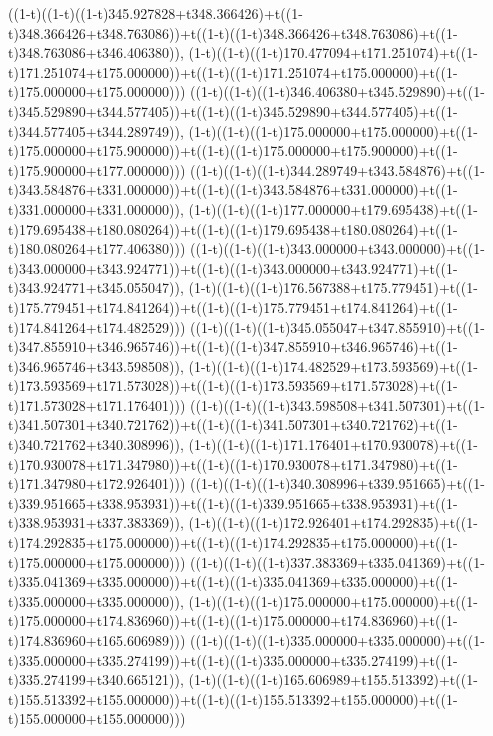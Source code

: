 ((1-t)((1-t)((1-t)345.927828+t348.366426)+t((1-t)348.366426+t348.763086))+t((1-t)((1-t)348.366426+t348.763086)+t((1-t)348.763086+t346.406380)),                                     (1-t)((1-t)((1-t)170.477094+t171.251074)+t((1-t)171.251074+t175.000000))+t((1-t)((1-t)171.251074+t175.000000)+t((1-t)175.000000+t175.000000)))
((1-t)((1-t)((1-t)346.406380+t345.529890)+t((1-t)345.529890+t344.577405))+t((1-t)((1-t)345.529890+t344.577405)+t((1-t)344.577405+t344.289749)),                                     (1-t)((1-t)((1-t)175.000000+t175.000000)+t((1-t)175.000000+t175.900000))+t((1-t)((1-t)175.000000+t175.900000)+t((1-t)175.900000+t177.000000)))
((1-t)((1-t)((1-t)344.289749+t343.584876)+t((1-t)343.584876+t331.000000))+t((1-t)((1-t)343.584876+t331.000000)+t((1-t)331.000000+t331.000000)),                                     (1-t)((1-t)((1-t)177.000000+t179.695438)+t((1-t)179.695438+t180.080264))+t((1-t)((1-t)179.695438+t180.080264)+t((1-t)180.080264+t177.406380)))
((1-t)((1-t)((1-t)343.000000+t343.000000)+t((1-t)343.000000+t343.924771))+t((1-t)((1-t)343.000000+t343.924771)+t((1-t)343.924771+t345.055047)),                                     (1-t)((1-t)((1-t)176.567388+t175.779451)+t((1-t)175.779451+t174.841264))+t((1-t)((1-t)175.779451+t174.841264)+t((1-t)174.841264+t174.482529)))
((1-t)((1-t)((1-t)345.055047+t347.855910)+t((1-t)347.855910+t346.965746))+t((1-t)((1-t)347.855910+t346.965746)+t((1-t)346.965746+t343.598508)),                                     (1-t)((1-t)((1-t)174.482529+t173.593569)+t((1-t)173.593569+t171.573028))+t((1-t)((1-t)173.593569+t171.573028)+t((1-t)171.573028+t171.176401)))
((1-t)((1-t)((1-t)343.598508+t341.507301)+t((1-t)341.507301+t340.721762))+t((1-t)((1-t)341.507301+t340.721762)+t((1-t)340.721762+t340.308996)),                                     (1-t)((1-t)((1-t)171.176401+t170.930078)+t((1-t)170.930078+t171.347980))+t((1-t)((1-t)170.930078+t171.347980)+t((1-t)171.347980+t172.926401)))
((1-t)((1-t)((1-t)340.308996+t339.951665)+t((1-t)339.951665+t338.953931))+t((1-t)((1-t)339.951665+t338.953931)+t((1-t)338.953931+t337.383369)),                                     (1-t)((1-t)((1-t)172.926401+t174.292835)+t((1-t)174.292835+t175.000000))+t((1-t)((1-t)174.292835+t175.000000)+t((1-t)175.000000+t175.000000)))
((1-t)((1-t)((1-t)337.383369+t335.041369)+t((1-t)335.041369+t335.000000))+t((1-t)((1-t)335.041369+t335.000000)+t((1-t)335.000000+t335.000000)),                                     (1-t)((1-t)((1-t)175.000000+t175.000000)+t((1-t)175.000000+t174.836960))+t((1-t)((1-t)175.000000+t174.836960)+t((1-t)174.836960+t165.606989)))
((1-t)((1-t)((1-t)335.000000+t335.000000)+t((1-t)335.000000+t335.274199))+t((1-t)((1-t)335.000000+t335.274199)+t((1-t)335.274199+t340.665121)),                                     (1-t)((1-t)((1-t)165.606989+t155.513392)+t((1-t)155.513392+t155.000000))+t((1-t)((1-t)155.513392+t155.000000)+t((1-t)155.000000+t155.000000)))
